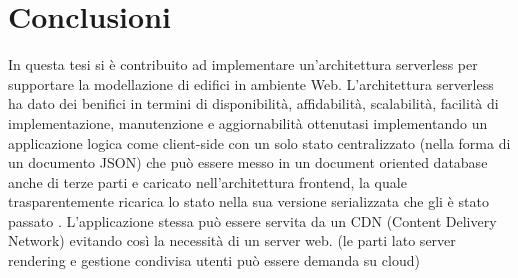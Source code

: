 \section{Conclusioni}
\label{sec:conclusions_section_1}

In questa tesi si è contribuito ad implementare un'architettura serverless per supportare la modellazione di edifici
in ambiente Web. L'architettura serverless ha dato dei benifici in termini di disponibilità, affidabilità,  scalabilità,
facilità di implementazione, manutenzione e aggiornabilità ottenutasi implementando un applicazione logica
come client-side con un solo stato centralizzato (nella forma di un documento JSON) che può essere messo in un
document oriented database anche di terze parti e caricato nell'architettura frontend, la quale
 trasparentemente ricarica lo stato nella sua versione serializzata che gli è stato passato .
 L'applicazione stessa può essere servita da un CDN (Content Delivery Network) evitando così la necessità di un server web.
(le parti lato server rendering e gestione condivisa utenti può essere demanda su cloud)

